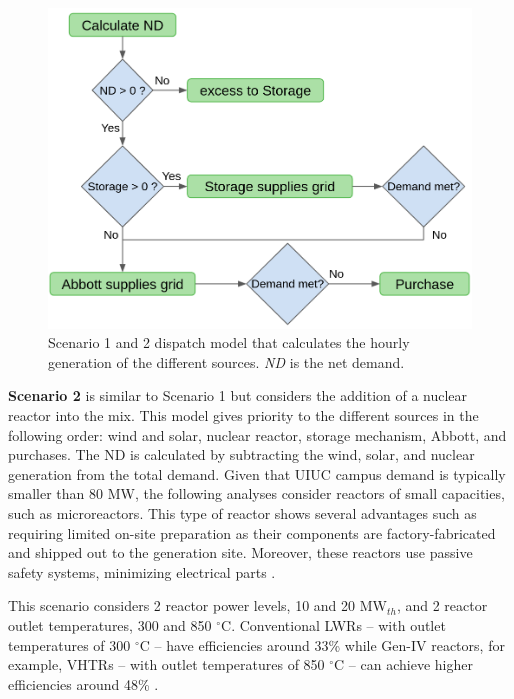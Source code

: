 \documentclass{anstrans}
\begin{document}
\begin{figure}[htbp!] %
    \centering
    \includegraphics[width=0.90\linewidth]{figures/dispatch-model}
    \hfill
    \caption{Scenario 1 and 2 dispatch model that calculates the hourly generation of the different sources. \textit{ND} is the net demand.}
    \label{fig:dispatch-model}
\end{figure}

\textbf{Scenario 2} is similar to Scenario 1 but considers the addition of a nuclear reactor into the mix.
This model gives priority to the different sources in the following order: wind and solar, nuclear reactor, storage mechanism, Abbott, and purchases.
The \gls{ND} is calculated by subtracting the wind, solar, and nuclear generation from the total demand.
Given that UIUC campus demand is typically smaller than 80 MW, the following analyses consider reactors of small capacities, such as microreactors.
This type of reactor shows several advantages such as requiring limited on-site preparation as their components are factory-fabricated and shipped out to the generation site.
Moreover, these reactors use passive safety systems, minimizing electrical parts \cite{us-doe_ultimate_2019}.

This scenario considers 2 reactor power levels, 10 and 20 MW$_{th}$, and 2 reactor outlet temperatures, 300 and 850 $^\circ$C.
Conventional \glspl{LWR} -- with outlet temperatures of 300 $^\circ$C -- have efficiencies around 33\% while Gen-IV reactors, for example, \glspl{VHTR} -- with outlet temperatures of 850 $^\circ$C -- can achieve higher efficiencies around 48\% \cite{fairhurst-agosta_multi-physics_2020}.
\end{document}
